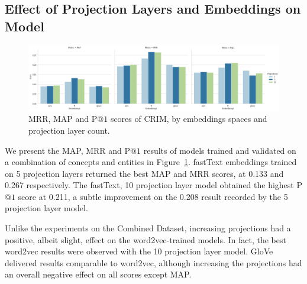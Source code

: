 \subsection{Effect of Projection Layers and Embeddings on Model}
\begin{figure}[ht!] 
  \centering
  \includegraphics[width=1.\linewidth]{images/semeval_crim_proj_embed.png}
  \caption{MRR, MAP and P$@1$ scores of CRIM, by embeddings spaces and projection layer count.}
  \label{fig:semeval_crim_proj_embed}
\end{figure}
We present the \ac{MAP}, \ac{MRR} and P$@1$ results of models trained and validated on a combination of concepts and entities in Figure~\ref{fig:semeval_crim_proj_embed}.  fastText embeddings trained on 5  projection layers returned the best \ac{MAP} and \ac{MRR} scores, at 0.133 and 0.267 respectively.  The fastText, 10 projection layer model obtained the highest P$@1$ score at 0.211, a subtle improvement on the 0.208 result recorded by the 5 projection layer model.

Unlike the experiments on the Combined Dataset, increasing projections had a positive, albeit slight, effect on the word2vec-trained models.  In fact, the best word2vec results were observed with the 10 projection layer model.  GloVe delivered results comparable to word2vec, although increasing the projections had an overall negative effect on all scores except \ac{MAP}.

